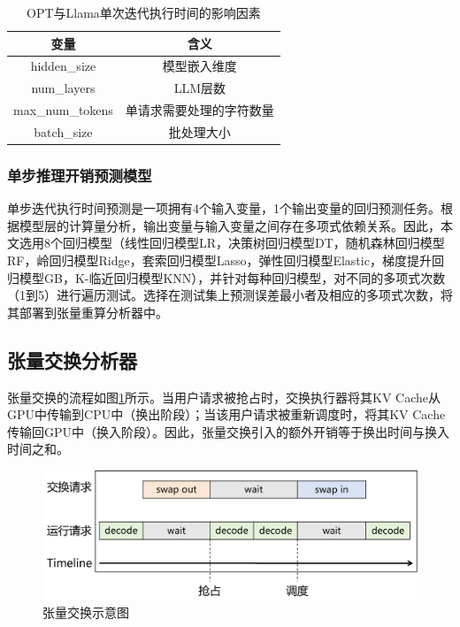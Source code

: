 \documentclass[a4paper, nosysfonts]{hpcchina}
\begin{document}
\begin{table}[H]
  \centering
  \caption{OPT与Llama单次迭代执行时间的影响因素}
  \label{OPT与Llama单次迭代执行时间的影响因素}
  \begin{tabular}{|c|c|}
    \hline
    \textbf{变量} & \textbf{含义} \\ \hline
    hidden\_size & 模型嵌入维度 \\ \hline
    num\_layers & LLM层数 \\ \hline
    max\_num\_tokens & 单请求需要处理的字符数量 \\ \hline
    batch\_size & 批处理大小 \\ \hline
  \end{tabular}
\end{table}

\subsubsection{单步推理开销预测模型}
单步迭代执行时间预测是一项拥有4个输入变量，1个输出变量的回归预测任务。根据模型层的计算量分析，输出变量与输入变量之间存在多项式依赖关系。因此，本文选用8个回归模型（线性回归模型LR，决策树回归模型DT，随机森林回归模型RF，岭回归模型Ridge，套索回归模型Lasso，弹性回归模型Elastic，梯度提升回归模型GB，K-临近回归模型KNN），并针对每种回归模型，对不同的多项式次数（1到5）进行遍历测试。选择在测试集上预测误差最小者及相应的多项式次数，将其部署到张量重算分析器中。 

\subsection{张量交换分析器}
张量交换的流程如图\ref{张量交换示意图}所示。当用户请求被抢占时，交换执行器将其KV Cache从GPU中传输到CPU中（换出阶段）；当该用户请求被重新调度时，将其KV Cache传输回GPU中（换入阶段）。因此，张量交换引入的额外开销等于换出时间与换入时间之和。 \par
\begin{figure}[!htbp]
  \centering
  \includegraphics[width=0.9\linewidth]
  {张量交换示意图.png}
  \caption{张量交换示意图}
  \label{张量交换示意图}
\end{figure}
\end{document}
